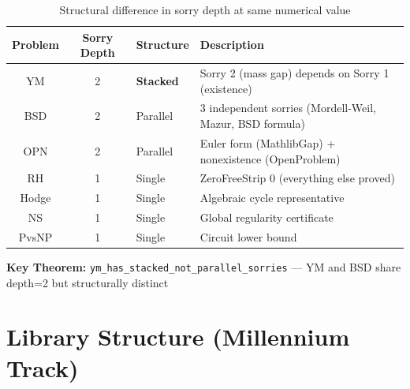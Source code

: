 \documentclass[11pt,a4paper]{article}
\begin{document}
\begin{table}[h!]
\centering
\caption{Structural difference in sorry depth at same numerical value}
\label{tab:sorrydepth}
\begin{tabular}{c c l l}
\toprule
\textbf{Problem} & \textbf{Sorry Depth} & \textbf{Structure} & \textbf{Description} \\
\midrule
YM & 2 & \textcolor{synthred}{\textbf{Stacked}} & Sorry 2 (mass gap) depends on Sorry 1 (existence) \\
BSD & 2 & \textcolor{synthgreen}{Parallel} & 3 independent sorries (Mordell-Weil, Mazur, BSD formula) \\
OPN & 2 & \textcolor{synthgreen}{Parallel} & Euler form (MathlibGap) + nonexistence (OpenProblem) \\
RH & 1 & Single & ZeroFreeStrip 0 (everything else proved) \\
Hodge & 1 & Single & Algebraic cycle representative \\
NS & 1 & Single & Global regularity certificate \\
PvsNP & 1 & Single & Circuit lower bound \\
\bottomrule
\end{tabular}
\end{table}

\noindent \textbf{Key Theorem:} \texttt{ym\_has\_stacked\_not\_parallel\_sorries} — YM and BSD share depth=2 but structurally distinct

\section{Library Structure (Millennium Track)}
\end{document}
